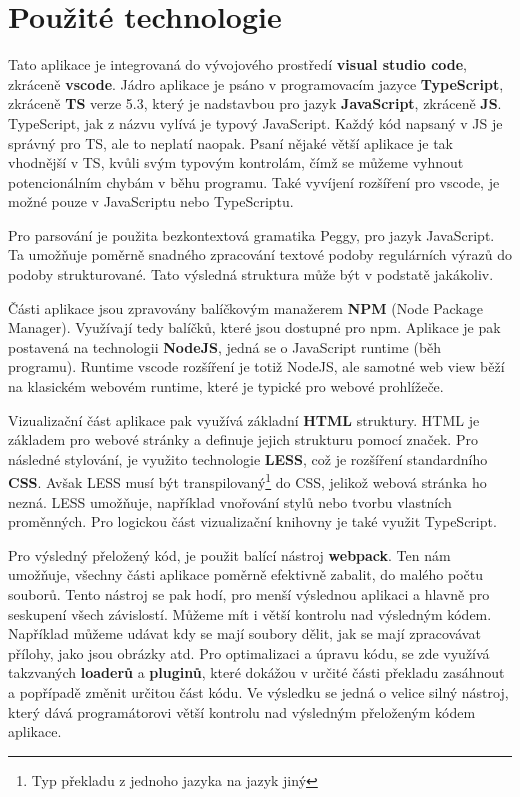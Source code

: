 \newpage

\section{Použité technologie}\label{sec:USEDtech}
Tato aplikace je integrovaná do vývojového prostředí \textbf{visual studio code}, 
zkráceně \textbf{vscode}. Jádro aplikace je psáno v programovacím jazyce \textbf{TypeScript}, zkráceně \textbf{TS} verze 5.3, který je nadstavbou
pro jazyk \textbf{JavaScript}, zkráceně \textbf{JS}. TypeScript, jak z názvu vylívá je typový JavaScript.
Každý kód napsaný v JS je správný pro TS, ale to neplatí naopak.
Psaní nějaké větší aplikace je tak vhodnější v TS, 
kvůli svým typovým kontrolám, čímž se můžeme vyhnout potencionálním chybám v běhu programu.
Také vyvíjení rozšíření pro vscode, je možné pouze v JavaScriptu nebo TypeScriptu.

Pro parsování je použita bezkontextová gramatika Peggy\cite{Peggy, Peggyjs}, pro jazyk JavaScript.
Ta umožňuje poměrně snadného zpracování textové podoby regulárních výrazů do podoby strukturované.
Tato výsledná struktura může být v podstatě jakákoliv.

Části aplikace jsou zpravovány balíčkovým manažerem \textbf{NPM} (Node Package Manager).
Využívají tedy balíčků, které jsou dostupné pro npm. 
Aplikace je pak postavená na technologii \textbf{NodeJS}, 
jedná se o JavaScript runtime (běh programu). 
Runtime vscode rozšíření je totiž NodeJS, ale samotné web view běží na klasickém webovém runtime, které je typické pro webové prohlížeče.

Vizualizační část aplikace pak využívá základní \textbf{HTML} struktury.  
HTML je základem pro webové stránky a definuje jejich strukturu pomocí značek.
Pro následné stylování, je využito technologie \textbf{LESS}, což je rozšíření standardního \textbf{CSS}.
Avšak LESS musí být transpilovaný\footnote{Typ překladu z jednoho jazyka na jazyk jiný} do CSS, jelikož webová stránka ho nezná. 
LESS umožňuje, například vnořování stylů nebo tvorbu vlastních proměnných.
Pro logickou část vizualizační knihovny je také využit TypeScript.

Pro výsledný přeložený kód, je použit balící nástroj \textbf{webpack}.
Ten nám umožňuje, všechny části aplikace poměrně efektivně zabalit, do malého počtu souborů. 
Tento nástroj se pak hodí, pro menší výslednou aplikaci a hlavně pro seskupení všech závislostí.
Můžeme mít i větší kontrolu nad výsledným kódem.
Například můžeme udávat kdy se mají soubory dělit, jak se mají zpracovávat přílohy, jako jsou obrázky atd.
Pro optimalizaci a úpravu kódu, se zde využívá takzvaných \textbf{loaderů} a \textbf{pluginů}, 
které dokážou v určité části překladu zasáhnout a popřípadě změnit určitou část kódu.
Ve výsledku se jedná o velice silný nástroj, který dává programátorovi větší kontrolu nad výsledným přeloženým kódem aplikace.

